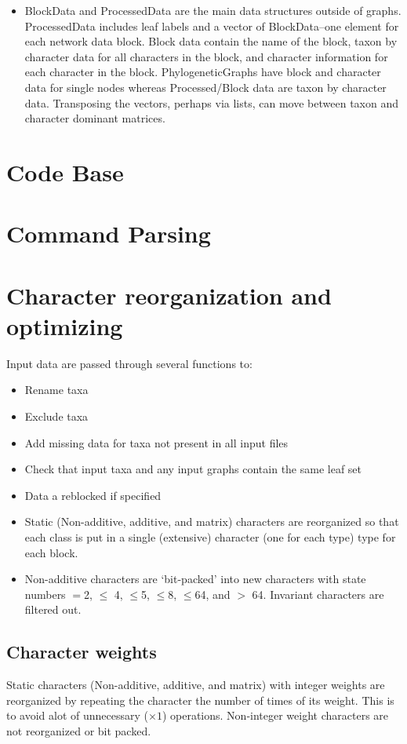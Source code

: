 \documentclass[11pt]{article}
\begin{document}
\begin{itemize}
		\item{BlockData and ProcessedData are the main data structures outside of graphs.  ProcessedData includes leaf labels and a 
			vector of BlockData--one element for each network data block.  Block data contain the name of the block, taxon by character 
			data for all characters in the block, and character information for each character in the block.  PhylogeneticGraphs have block and 
			character data for single nodes whereas Processed/Block data are taxon by character data.  Transposing the vectors, perhaps
			via lists, can move between taxon and character dominant  matrices.}
		
	\end{itemize}
	
	
	\section{Code Base}
	
	\section {Command Parsing}
	
	\section{Character reorganization and optimizing}
		Input data are passed through several functions to:
		\begin{itemize}
			\item{Rename taxa}
			\item{Exclude taxa}
			\item{Add missing data for taxa not present in all input files}
			\item{Check that input taxa and any input graphs contain the same leaf set}
			\item{Data a reblocked if specified}
			\item{Static (Non-additive, additive, and matrix) characters are reorganized so that
				each class is put in a single (extensive) character (one for each type) type for each block.}
			\item{Non-additive characters are `bit-packed' into new characters with state numbers $=$2, $\leq$
				4, $\leq$5, $\leq$8, $\leq$64, and $>$ 64. Invariant characters are filtered out.}
			 
		\end{itemize}
		\subsection{Character weights}
		Static characters (Non-additive, additive, and matrix) with integer weights are reorganized
		by repeating the character the number of times of its weight.  This is to avoid alot of 
		unnecessary ($\times 1$) operations.  Non-integer weight characters are not reorganized or
		bit packed.
		
\end{document}
